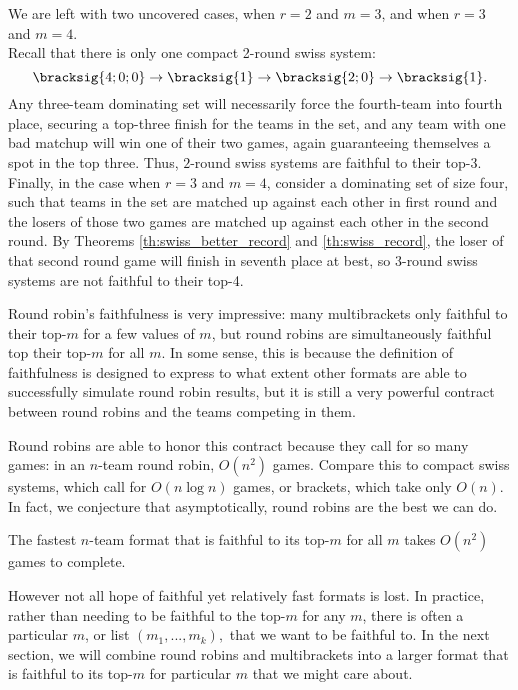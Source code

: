 {{        We are left with two uncovered cases, when $r = 2$ and $m = 3$, and when $r = 3$ and $m = 4.$\\

        Recall that there is only one compact 2-round swiss system: $$\bracksig{4;0;0} \to \bracksig{1} \to \bracksig{2;0} \to \bracksig{1}.$$ Any three-team dominating set will necessarily force the fourth-team into fourth place, securing a top-three finish for the teams in the set, and any team with one bad matchup will win one of their two games, again guaranteeing themselves a spot in the top three. Thus, $2$-round swiss systems are faithful to their top-3.\\

        Finally, in the case when $r = 3$ and $m = 4$, consider a dominating set of size four, such that teams in the set are matched up against each other in first round and the losers of those two games are matched up against each other in the second round. By Theorems \ref{th:swiss_better_record} and \ref{th:swiss_record}, the loser of that second round game will finish in seventh place at best, so $3$-round swiss systems are not faithful to their top-4.
    }{}

    Round robin's faithfulness is very impressive: many multibrackets only faithful to their top-$m$ for a few values of $m$, but round robins are simultaneously faithful top their top-$m$ for all $m.$ In some sense, this is because the definition of faithfulness is designed to express to what extent other formats are able to successfully simulate round robin results, but it is still a very powerful contract between round robins and the teams competing in them.

    Round robins are able to honor this contract because they call for so many games: in an $n$-team round robin, $O(n^2)$ games. Compare this to compact swiss systems, which call for $O(n\log n)$ games, or brackets, which take only $O(n).$ In fact, we conjecture that asymptotically, round robins are the best we can do.

    \begin{conj}{}{}
        The fastest $n$-team format that is faithful to its top-$m$ for all $m$ takes $O(n^2)$ games to complete.
    \end{conj}

    However not all hope of faithful yet relatively fast formats is lost. In practice, rather than needing to be faithful to the top-$m$ for any $m$, there is often a particular $m$, or list $(m_1, ..., m_k),$ that we want to be faithful to. In the next section, we will combine round robins and multibrackets into a larger format that is faithful to its top-$m$ for particular $m$ that we might care about.
}
